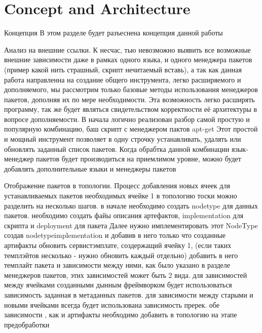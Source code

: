 
\chapter{Concept and Architecture}\label{chap:conarch}

Концепция
В этом разделе будет разъеснена концепция данной работы

Анализ на внешние ссылки. 
К несчас, тью невозможно выявить все возможные внешние зависимости даже в рамках одного языка, и одного менеджера пакетов (пример какой нить страшный, скрипт нечитаемый вставь), а так как данная работа направленна на создание общего инструмента, легко расширяемого и дополняемого, мы рассмотрим только базовые методы использования менеджеров пакетов, дополняя их по мере необходимости. Эта возможность легко расширять программу, так же будет являться свидетельством корректности её архитектуры в вопросе дополняемости.
В начала логично реализован разбор самой простую и популярную комбинацию, баш скрипт с менеджером пактов apt-get 
Этот простой и мощный инструмент позволяет в одну строчку устанавливать, удалять или обновлять заданный список пакетов.
Когда обрабтка данной комбинации язык-менеджер пакетов будет производиться на приемлимом уровне, можно будет добавлять дополнительные языки и менеджеры пакетов

Отображение пакетов в топологии. Процесс добавления новых ячеек для устанавливаемых пакетов необходимых ячейке 1 в топологию тоски можно разделить на несколько шагов. 
в начале необходимо создать nodetype для данных пакетов. 
необходимо создать файы описания артефактов, implementation для скрипта и deployment для пакета
Далее нужно имплементировать этот NodeType  создав nodetypeimplementation и добавив в него только что созданные артифакты
обновить сервистэмплате, создержащий ячейку 1, (если таких темплэйтов несколько - нужно обновить каждый отдельно)
добавить в него темплайт пакета и зависимости между ними, как было указано в разделе менеджеров пакетов, этих зависимостей может быть 2 вида. 
для зависимостей между ячейками созданными дынным фреймворком будет использоваться зависимость заданная в метаданных пакетов.
для зависимости между старыми и новыми ячейками всегда будет использована зависимость пререк.
обе зависимости , как и артифакты необходимо добавить в топологию на этапе предобработки


